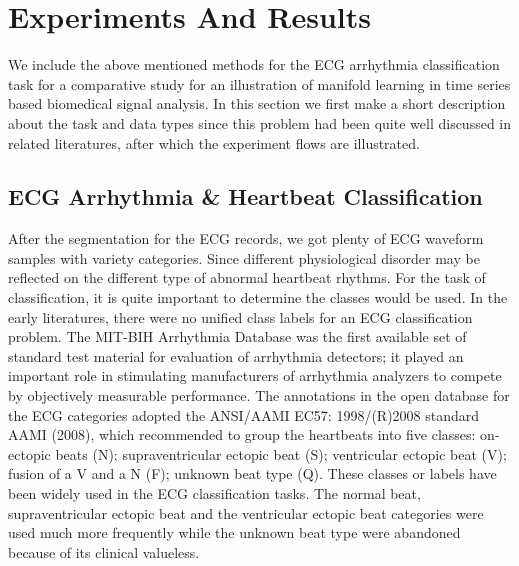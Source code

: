\documentclass[journal]{IEEEtran}
\begin{document}
%
%


\section{Experiments And Results}
We include the above mentioned methods for the ECG arrhythmia classification task for a comparative study for an illustration of manifold learning in time series based biomedical signal analysis.
In this section we first make a short description about the task and data types since this problem had been quite well discussed in related literatures, after which the experiment flows are illustrated.



%
%
\subsection{ECG Arrhythmia \& Heartbeat Classification}

After the segmentation for the ECG records, we got plenty of ECG waveform samples with variety categories. 
Since different physiological disorder may be reflected on the different type of abnormal heartbeat rhythms. 
For the task of classification, it is quite important to determine the classes would be used. 
In the early literatures, there were no unified class labels for an ECG classification problem. 
The MIT-BIH Arrhythmia Database was the first available set of standard test material for evaluation of arrhythmia detectors; it played an important role in stimulating manufacturers of arrhythmia analyzers to compete by objectively measurable performance. 
The annotations in the open database for the ECG categories adopted the ANSI/AAMI EC57: 1998/(R)2008 standard AAMI (2008), which recommended to group the heartbeats into five classes: on-ectopic beats (N); supraventricular ectopic beat (S); ventricular ectopic beat (V); fusion of a V and a N (F); unknown beat type (Q). These classes or labels have been widely used in the ECG classification tasks. 
The normal beat, supraventricular ectopic beat and the ventricular ectopic beat categories were used much more frequently while the unknown beat type were abandoned because of its clinical valueless.
\end{document}
